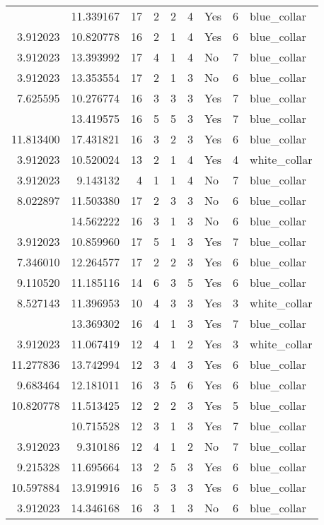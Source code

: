 \documentclass[
]{article}
\begin{document}
\begin{longtable}[t]{rrrrrllrl}
\addlinespace
9.396820 & 11.339167 & 17 & 2 & 2 & 4 & Yes & 6 & blue\_collar\\
3.912023 & 10.820778 & 16 & 2 & 1 & 4 & Yes & 6 & blue\_collar\\
3.912023 & 13.393992 & 17 & 4 & 1 & 4 & No & 7 & blue\_collar\\
3.912023 & 13.353554 & 17 & 2 & 1 & 3 & No & 6 & blue\_collar\\
7.625595 & 10.276774 & 16 & 3 & 3 & 3 & Yes & 7 & blue\_collar\\
\addlinespace
13.815561 & 13.419575 & 16 & 5 & 5 & 3 & Yes & 7 & blue\_collar\\
11.813400 & 17.431821 & 16 & 3 & 2 & 3 & Yes & 6 & blue\_collar\\
3.912023 & 10.520024 & 13 & 2 & 1 & 4 & Yes & 4 & white\_collar\\
3.912023 & 9.143132 & 4 & 1 & 1 & 4 & No & 7 & blue\_collar\\
8.022897 & 11.503380 & 17 & 2 & 3 & 3 & No & 6 & blue\_collar\\
\addlinespace
3.912023 & 14.562222 & 16 & 3 & 1 & 3 & No & 6 & blue\_collar\\
3.912023 & 10.859960 & 17 & 5 & 1 & 3 & Yes & 7 & blue\_collar\\
7.346010 & 12.264577 & 17 & 2 & 2 & 3 & Yes & 6 & blue\_collar\\
9.110520 & 11.185116 & 14 & 6 & 3 & 5 & Yes & 6 & blue\_collar\\
8.527143 & 11.396953 & 10 & 4 & 3 & 3 & Yes & 3 & white\_collar\\
\addlinespace
3.912023 & 13.369302 & 16 & 4 & 1 & 3 & Yes & 7 & blue\_collar\\
3.912023 & 11.067419 & 12 & 4 & 1 & 2 & Yes & 3 & white\_collar\\
11.277836 & 13.742994 & 12 & 3 & 4 & 3 & Yes & 6 & blue\_collar\\
9.683464 & 12.181011 & 16 & 3 & 5 & 6 & Yes & 6 & blue\_collar\\
10.820778 & 11.513425 & 12 & 2 & 2 & 3 & Yes & 5 & blue\_collar\\
\addlinespace
3.912023 & 10.715528 & 12 & 3 & 1 & 3 & Yes & 7 & blue\_collar\\
3.912023 & 9.310186 & 12 & 4 & 1 & 2 & No & 7 & blue\_collar\\
9.215328 & 11.695664 & 13 & 2 & 5 & 3 & Yes & 6 & blue\_collar\\
10.597884 & 13.919916 & 16 & 5 & 3 & 3 & Yes & 6 & blue\_collar\\
3.912023 & 14.346168 & 16 & 3 & 1 & 3 & No & 6 & blue\_collar\\

\end{longtable}
\end{document}
